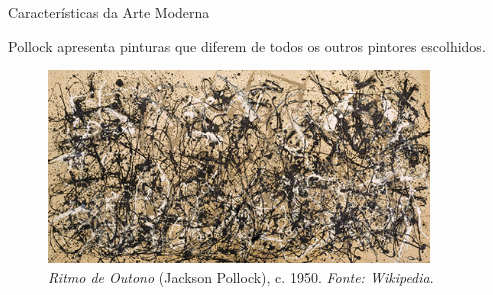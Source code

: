 \documentclass{beamer}
\begin{document}
\begin{frame}{Características da Arte Moderna}

  Pollock apresenta pinturas que diferem de todos os outros
  pintores escolhidos.

  \begin{figure}[h!]
  \begin{center}
  \includegraphics[width=0.9\textwidth]{figs/pollock_ritmo.png}
  \caption{\emph{Ritmo de Outono} (Jackson Pollock), c. 1950. \textit{Fonte: Wikipedia}.}
  \label{fig:pollock:ritmo}
  \end{center}
\end{figure}

\end{frame}
\end{document}
